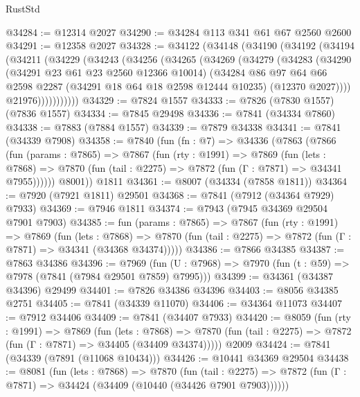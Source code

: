 \begin{lexlean}{RustStd}
\begin{coremodule}
{\begin{coremodule}
{{{{{{{{{{{{{{{{{{{{{{{{{{{{{{{{{{{{{{{{{{{{{{{{{{{{{{@34284 := @12314 @2027
@34290 := @34284 @113 @341 @61 @67 @2560 @2600
@34291 := @12358 @2027
@34328 := @34122
    (@34148
      (@34190
        (@34192
          (@34194
            (@34211
              (@34229
                (@34243
                  (@34256
                    (@34265
                      (@34269
                        (@34279
                          (@34283
                            (@34290
                              (@34291 @23 @61 @23 @2560 @12366 @10014)
                              (@34284
                                @86
                                @97
                                @64
                                @66
                                @2598
                                @2287
                                (@34291 @18 @64 @18 @2598 @12444 @10235)
                                (@12370 @2027))))
                          @21976)))))))))))
@34329 := @7824 @1557
@34333 := @7826 (@7830 @1557) (@7836 @1557)
@34334 := @7845 @29498
@34336 := @7841 (@34334 @7860)
@34338 := @7883 (@7884 @1557)
@34339 := @7879 @34338
@34341 := @7841 (@34339 @7908)
@34358 := @7840
    (fun (fn : @7) =>
    @34336
      (@7863
        (@7866
          (fun (params : @7865) =>
          @7867
            (fun (rty : @1991) =>
            @7869
              (fun (lets : @7868) =>
              @7870 (fun (tail : @2275) => @7872 (fun (Γ : @7871) => @34341 @7955))))))
        @8001))
    @1811
@34361 := @8007 (@34334 (@7858 @1811))
@34364 := @7920 (@7921 @1811) @29501
@34368 := @7841 (@7912 (@34364 @7929) @7933)
@34369 := @7946 @1811
@34374 := @7943 (@7945 @34369 @29504 @7901 @7903)
@34385 := fun (params : @7865) =>
  @7867
    (fun (rty : @1991) =>
    @7869
      (fun (lets : @7868) =>
      @7870 (fun (tail : @2275) => @7872 (fun (Γ : @7871) => @34341 (@34368 @34374)))))
@34386 := @7866 @34385
@34387 := @7863 @34386
@34396 := @7969
    (fun (U : @7968) => @7970 (fun (t : @59) => @7978 (@7841 (@7984 @29501 @7859) @7995)))
@34399 := @34361 (@34387 @34396) @29499
@34401 := @7826 @34386 @34396
@34403 := @8056 @34385 @2751
@34405 := @7841 (@34339 @11070)
@34406 := @34364 @11073
@34407 := @7912 @34406
@34409 := @7841 (@34407 @7933)
@34420 := @8059
    (fun (rty : @1991) =>
    @7869
      (fun (lets : @7868) =>
      @7870 (fun (tail : @2275) => @7872 (fun (Γ : @7871) => @34405 (@34409 @34374)))))
    @2009
@34424 := @7841 (@34339 (@7891 (@11068 @10434)))
@34426 := @10441 @34369 @29504
@34438 := @8081
    (fun (lets : @7868) =>
    @7870
      (fun (tail : @2275) =>
      @7872 (fun (Γ : @7871) => @34424 (@34409 (@10440 (@34426 @7901 @7903))))))
}}}}}}}}}}}}}}}}}}}}}}}}}}}}}}}}}}}}}}}}}}}}}}}}}}}}}}
\end{coremodule}}
\end{coremodule}
\end{lexlean}
